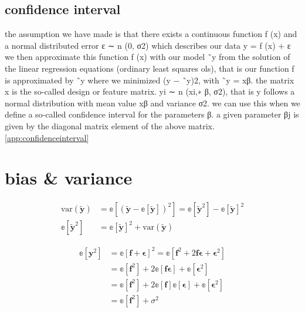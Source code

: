 \documentclass[twoside,11pt]{report}
\begin{document}
\subsection{confidence interval}
\label{sec:confidenceinterval}

the assumption we have made is that there exists a continuous function f (x)
and a normal distributed error ε ∼ n (0, σ2) which describes our data
y = f (x) + ε
we then approximate this function f (x) with our model ˜y from the solution
of the linear regression equations (ordinary least squares ols), that is our
function f is approximated by ˜y where we minimized (y − ˜y)2, with
˜y = xβ.
the matrix x is the so-called design or feature matrix.
yi ∼ n (xi,∗ β, σ2), that is y follows a normal distribution with mean
value xβ and variance σ2.
we can use this when we define a so-called confidence interval
for the parameters β. a given parameter βj is given by the diagonal matrix
element of the above matrix.
\ref{app:confidenceinterval}







\section{bias \& variance}
\label{sec:biasvariance}


\begin{align*}
    \text{var}(\mathbf{\tilde{y}}) &= \mathbb{e}\left[\left(\tilde{\mathbf{y}}-\mathbb{e}\left[\mathbf{\tilde{y}}\right]\right)^2\right] = \mathbb{e}[\mathbf{\tilde{y}}^2] - \mathbb{e}[\mathbf{\tilde{y}}]^2\\
    \mathbb{e}[\mathbf{\tilde{y}}^2] &= \mathbb{e}[\mathbf{\tilde{y}}]^2 + \text{var}(\mathbf{\tilde{y}})
\end{align*}


\begin{align*}
\mathbb{e}[\mathbf{y}^2] & = \mathbb{e}[\mathbf{f} + \mathbf{\epsilon}]^2 = \mathbb{e}[\mathbf{f}^2 + 2\mathbf{f}\mathbf{\epsilon} + \mathbf{\epsilon}^2]\\
& = \mathbb{e}[\mathbf{f}^2] + 2\mathbb{e}[\mathbf{f}\mathbf{\epsilon}] + \mathbb{e}[\mathbf{\epsilon}^2]\\
& = \mathbb{e}[\mathbf{f}^2] + 2\mathbb{e}[\mathbf{f}]\mathbb{e}[\mathbf{\epsilon}] + \mathbb{e}[\mathbf{\epsilon}^2]\\
& = \mathbb{e}[\mathbf{f}^2]  + \sigma^2
\end{align*}
\end{document}
